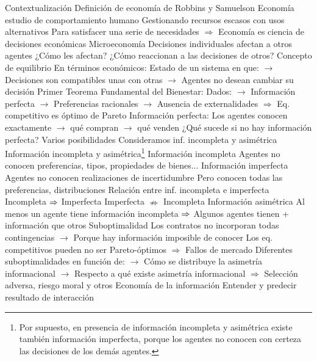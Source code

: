 \documentclass{nuevotema}
\begin{document}
\begin{esquemal}
	\1[] 
		\2 Contextualización
			\3 Definición de economía de Robbins y Samuelson
				\4 Economía estudio de comportamiento humano
				\4[] Gestionando recursos escasos con usos alternativos
				\4[] Para satisfacer una serie de necesidades
				\4[] $\Rightarrow$ Economía es ciencia de decisiones económicas
			\3 Microeconomía
				\4 Decisiones individuales afectan a otros agentes
				\4[$\to$] ¿Cómo les afectan?
				\4[$\to$] ¿Cómo reaccionan a las decisiones de otros?
				\4 Concepto de equilibrio
				\4[] En términos económicos:
				\4[] Estado de un sistema en que:
				\4[] $\to$ Decisiones son compatibles unas con otras
				\4[] $\to$ Agentes no desean cambiar su decisión
				\4 Primer Teorema Fundamental del Bienestar:
				\4[] Dados:
				\4[] $\to$ Información perfecta
				\4[] $\to$ Preferencias racionales
				\4[] $\to$ Ausencia de externalidades
				\4[] $\Rightarrow$ Eq. competitivo es óptimo de Pareto
				\4 Información perfecta:
				\4[] Los agentes conocen exactamente
				\4[] $\to$ qué compran
				\4[] $\to$ qué venden
				\4 ¿Qué sucede si no hay información perfecta?
				\4[] Varios posibilidades
				\4[] Consideramos inf. incompleta y asimétrica
			\3 Información incompleta y asimétrica\footnote{Por supuesto, en presencia de información incompleta y asimétrica existe también información imperfecta, porque los agentes no conocen con certeza las decisiones de los demás agentes.}
				\4 Información incompleta
				\4[] Agentes no conocen preferencias, tipos, propiedades de bienes...
				\4 Información imperfecta
				\4[] Agentes no conocen realizaciones de incertidumbre
				\4[] Pero conocen todas las preferencias, distribuciones
				\4 Relación entre inf. incompleta e imperfecta
				\4[] Incompleta $\Rightarrow$ Imperfecta
				\4[] Imperfecta $\nRightarrow$ Incompleta
				\4 Información asimétrica
				\4[] Al menos un agente tiene información incompleta
				\4[] $\Rightarrow$ Algunos agentes tienen
				+ información que otros
				\4 Suboptimalidad
				\4[] Los contratos no incorporan todas contingencias
				\4[] $\to$ Porque hay información imposible de conocer
				\4[] Los eq. competitivos pueden no ser Pareto-óptimos
				\4[] $\Rightarrow$ Fallos de mercado
				\4[] Diferentes suboptimalidades en función de:
				\4[] $\to$ Cómo se distribuye la asimetría informacional
				\4[] $\to$ Respecto a qué existe asimetría informacional
				\4[] $\Rightarrow$ Selección adversa, riesgo moral y otros
			\3 Economía de la información
				\4 Entender y predecir resultado de interacción

\end{esquemal}
\end{document}
